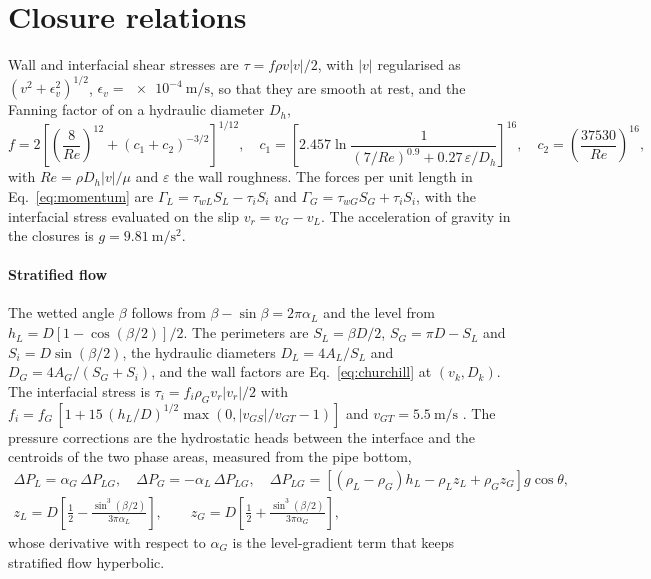 \documentclass[a4paper,fleqn]{cas-sc}
\newcommand{\aG}{\alpha_G}
\newcommand{\aL}{\alpha_L}
\begin{document}
\section{Closure relations}\label{app:closures}

Wall and interfacial shear stresses are $\tau = f\rho v|v|/2$, with $|v|$ regularised as $(v^2 + \epsilon_v^2)^{1/2}$, $\epsilon_v = \SI{e-4}{\metre\per\second}$, so that they are smooth at rest, and the Fanning factor of \citet{churchill1977} on a hydraulic diameter $D_h$,
\begin{equation}\label{eq:churchill}
f = 2\left[\left(\frac{8}{Re}\right)^{12} + \left(c_1 + c_2\right)^{-3/2}\right]^{1/12}, \quad c_1 = \left[2.457\ln\frac{1}{(7/Re)^{0.9} + 0.27\,\varepsilon/D_h}\right]^{16}, \quad c_2 = \left(\frac{37530}{Re}\right)^{16},
\end{equation}
with $Re = \rho D_h|v|/\mu$ and $\varepsilon$ the wall roughness. The forces per unit length in Eq.~\eqref{eq:momentum} are $\Gamma_L = \tau_{wL}S_L - \tau_i S_i$ and $\Gamma_G = \tau_{wG}S_G + \tau_i S_i$, with the interfacial stress evaluated on the slip $v_r = v_G - v_L$. The acceleration of gravity in the closures is $g = \SI{9.81}{\metre\per\square\second}$.

\paragraph{Stratified flow} The wetted angle $\beta$ follows from $\beta - \sin\beta = 2\pi\aL$ and the level from $h_L = D[1 - \cos(\beta/2)]/2$. The perimeters are $S_L = \beta D/2$, $S_G = \pi D - S_L$ and $S_i = D\sin(\beta/2)$, the hydraulic diameters $D_L = 4A_L/S_L$ and $D_G = 4A_G/(S_G + S_i)$, and the wall factors are Eq.~\eqref{eq:churchill} at $(v_k, D_k)$. The interfacial stress is $\tau_i = f_i\rho_G v_r|v_r|/2$ with $f_i = f_G\,[1 + 15\,(h_L/D)^{1/2}\max(0, |v_{GS}|/v_{GT} - 1)]$ and $v_{GT} = \SI{5.5}{\metre\per\second}$ \citep{andritsos1987}. The pressure corrections are the hydrostatic heads between the interface and the centroids of the two phase areas, measured from the pipe bottom,
\begin{gather}
\Delta P_L = \aG\,\Delta P_{LG}, \quad \Delta P_G = -\aL\,\Delta P_{LG}, \quad \Delta P_{LG} = \left[(\rho_L - \rho_G)h_L - \rho_L z_L + \rho_G z_G\right] g\cos\theta, \\
z_L = D\left[\frac12 - \frac{\sin^3(\beta/2)}{3\pi\aL}\right], \qquad z_G = D\left[\frac12 + \frac{\sin^3(\beta/2)}{3\pi\aG}\right],
\end{gather}
whose derivative with respect to $\aG$ is the level-gradient term that keeps stratified flow hyperbolic.
\end{document}
